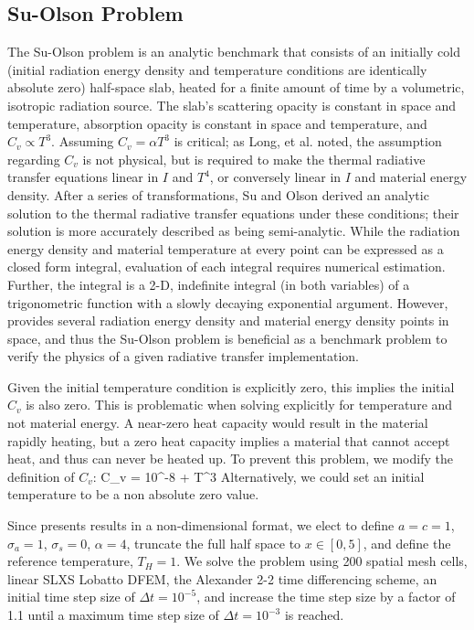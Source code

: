 \subsection{Su-Olson Problem}

The Su-Olson problem \cite{su_olson_1} is an analytic benchmark that consists of an initially cold (initial radiation energy density and temperature conditions are identically absolute zero) half-space slab, heated for a finite amount of time by a volumetric, isotropic radiation source.
The slab's scattering opacity is constant in space and temperature, absorption opacity is constant in space and temperature, and $C_v \propto T^3$.
Assuming $C_v = \alpha T^3$ is critical; as Long, et al. \cite{alex_paper} noted, the assumption regarding $C_v$ is not physical, but is required to make the thermal radiative transfer equations linear in $I$ and $T^4$, or conversely linear in $I$ and material energy density. 
After a series of transformations, Su and Olson derived an analytic solution to the thermal radiative transfer equations under these conditions; their solution is more accurately described as being semi-analytic.
While the radiation energy density and material temperature at every point can be expressed as a closed form integral, evaluation of each integral requires numerical estimation.
Further, the integral is a 2-D, indefinite integral (in both variables) of a trigonometric function with a slowly  decaying exponential argument.
However, \cite{su_olson_1} provides several radiation energy density and material energy density points in space, and thus the Su-Olson problem is beneficial as a benchmark problem to verify the physics of a given radiative transfer implementation.

Given the initial temperature condition is explicitly zero, this implies the initial $C_v$ is also zero.
This is problematic when solving explicitly for temperature and not material energy.
A near-zero heat capacity would result in the material rapidly heating, but a zero heat capacity implies a material that cannot accept heat, and thus can never be heated up.
To prevent this problem, we modify the definition of $C_v$:
\benum
C_v = 10^{-8} + \alpha T^3 \pep
\eenum
Alternatively, we could set an initial temperature to be a non absolute zero value.

Since \cite{su_olson_1} presents results in a non-dimensional format, we elect to define $a=c=1$, $\sigma_a = 1$, $\sigma_s=0$, $\alpha = 4$, truncate the full half space to $x\in[0,5]$, and define the reference temperature, $T_H = 1$.
We solve the problem using 200 spatial mesh cells, linear SLXS Lobatto DFEM, the Alexander 2-2 time differencing scheme, an initial time step size of $\Delta t = 10^{-5}$, and increase the time step size by a factor of 1.1 until a maximum time step size of $\Delta t = 10^{-3}$ is reached.

